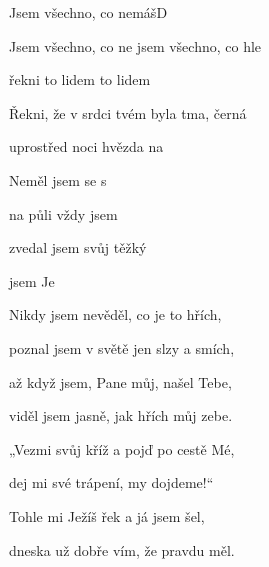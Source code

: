 \setcounter{page}{106}
\begin{song}{Jsem všechno, co nemáš}{D}{}

\begin{SBChorus}

Jsem všechno, co ne jsem všechno, co hle 

řekni to lidem   to lidem  

Řekni, že v srdci tvém byla tma, černá  

uprostřed noci   hvězda na 

\end{SBChorus}

\begin{SBVerse}

Neměl jsem  se s   

na půli  vždy  jsem  

zvedal jsem  svůj těžký 

 jsem   Je

\end{SBVerse}

\begin{SBVerse}

Nikdy jsem nevěděl, co je to hřích, 

poznal jsem v světě jen slzy a smích, 

až když jsem, Pane můj, našel Tebe, 

viděl jsem jasně, jak hřích můj zebe.

\end{SBVerse}

\begin{SBVerse}

„Vezmi svůj kříž a pojď po cestě Mé, 

dej mi své trápení, my dojdeme!“ 

Tohle mi Ježíš řek a já jsem šel, 

dneska už dobře vím, že pravdu měl.

\end{SBVerse}

\end{song}
\pagebreak
